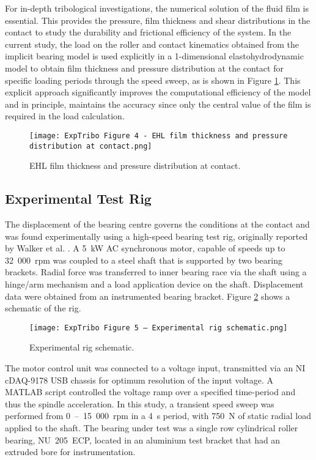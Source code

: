 For in-depth tribological investigations, the numerical solution of the fluid film is essential. This provides the pressure, film thickness and shear distributions in the contact to study the durability and frictional efficiency of the system. In the current study, the load on the roller and contact kinematics obtained from the implicit bearing model is used explicitly in a 1-dimensional elastohydrodynamic model to obtain film thickness and pressure distribution at the contact for specific loading periods through the speed sweep, as is shown in Figure \ref{EHL film thickness and pressure distribution at contact}. This explicit approach significantly improves the computational efficiency of the model and in principle, maintains the accuracy since only the central value of the film is required in the load calculation.

\begin{figure}
	\centerline{\texttt{[image: ExpTribo Figure 4 - EHL film thickness and pressure distribution at contact.png]}}
	\caption{EHL film thickness and pressure distribution at contact.}
	\label{EHL film thickness and pressure distribution at contact}
\end{figure}

\subsection{Experimental Test Rig}

The displacement of the bearing centre governs the conditions at the contact and was found experimentally using a high-speed bearing test rig, originally reported by Walker et al. \cite{Walker2018a}. A 5~kW AC synchronous motor, capable of speeds up to 32~000~rpm was coupled to a steel shaft that is supported by two bearing brackets. Radial force was transferred to inner bearing race via the shaft using a hinge/arm mechanism and a load application device on the shaft. Displacement data were obtained from an instrumented bearing bracket. Figure \ref{Experimental rig schematic} shows a schematic of the rig.

\begin{figure}
	\centerline{\texttt{[image: ExpTribo Figure 5 – Experimental rig schematic.png]}}
	\caption{Experimental rig schematic.}
	\label{Experimental rig schematic}
\end{figure}

The motor control unit was connected to a voltage input, transmitted via an NI cDAQ-9178 USB chassis for optimum resolution of the input voltage. A MATLAB script controlled the voltage ramp over a specified time-period and thus the spindle acceleration. In this study, a transient speed sweep was performed from 0~–~15~000~rpm in a 4~s period, with 750~N of static radial load applied to the shaft. The bearing under test was a single row cylindrical roller bearing, NU~205~ECP, located in an aluminium test bracket that had an extruded bore for instrumentation.

